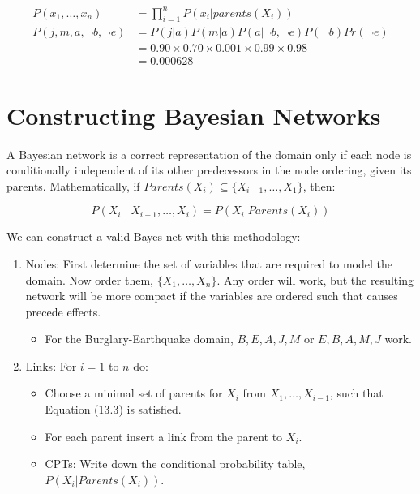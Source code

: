 \documentclass[smaller]{article}
\begin{document}
\begin{align*}
P(x_1, \dots, x_n)         &= \prod_{i=1}^n P( x_i | parents(X_i)) \tag{13.2}\\
P(j, m, a, \neg b, \neg e) &= P(j | a) P(m | a) P(a | \neg b, \neg e) P(\neg b) Pr (\neg e)\\
                            &= 0.90 \times 0.70 \times 0.001 \times 0.99 \times 0.98\\
                            &= 0.000628
\end{align*}
\section{Constructing Bayesian Networks}
\label{sec:orgd658a70}

A Bayesian network is a correct representation of the domain only if each node is conditionally independent of its other predecessors in the node ordering, given its parents.  Mathematically, if \(Parents(X_i) \subseteq \{X_{i-1}, \dots, X_1\}\), then:

\begin{equation}
P(X_i \mid X_{i-1}, \dots, X_i) = P(X_i \vert Parents(X_i)) \tag{13.3}
\end{equation}

We can construct a valid Bayes net with this methodology:

\begin{enumerate}
\item Nodes: First determine the set of variables that are required to model the domain. Now order them, \(\{X_1, \dots ,X_n\}\). Any order will work, but the resulting network will be more compact if the variables are ordered such that causes precede effects.

\begin{itemize}
\item For the Burglary-Earthquake domain, \(B,E,A,J,M\) or \(E,B,A,M,J\) work.
\end{itemize}

\item Links: For \(i = 1\) to \(n\) do:

\begin{itemize}
\item Choose a minimal set of parents for \(X_i\) from \(X_1, \dots ,X_{i-1}\), such that Equation (13.3) is satisfied.
\item For each parent insert a link from the parent to \(X_i\).
\item CPTs: Write down the conditional probability table, \(P(X_i|Parents(X_i))\).
\end{itemize}
\end{enumerate}
\end{document}
